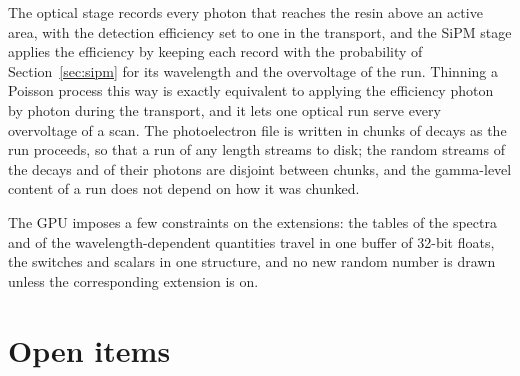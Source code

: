\documentclass[11pt]{article}
\begin{document}
The optical stage records every photon that reaches the resin above an
active area, with the detection efficiency set to one in the transport, and
the SiPM stage applies the efficiency by keeping each record with the
probability of Section~\ref{sec:sipm} for its wavelength and the overvoltage
of the run. Thinning a Poisson process this way is exactly equivalent to
applying the efficiency photon by photon during the transport, and it lets
one optical run serve every overvoltage of a scan. The photoelectron file is
written in chunks of decays as the run proceeds, so that a run of any length
streams to disk; the random streams of the decays and of their photons are
disjoint between chunks, and the gamma-level content of a run does not
depend on how it was chunked.

The GPU imposes a few constraints on the extensions: the tables of the
spectra and of the wavelength-dependent quantities travel in one buffer of
32-bit floats, the switches and scalars in one structure, and no new random
number is drawn unless the corresponding extension is on.

\section{Open items}
\label{sec:open}
\end{document}
